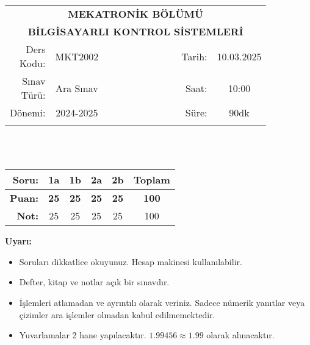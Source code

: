\newcommand\UniversiteAdi{Niğde Ömer Halisdemir Üniversitesi}
\newcommand\BolumAdi{MEKATRONİK BÖLÜMÜ}
\newcommand\DersKodu{MKT2002}
\newcommand\DersAdi{BİLGİSAYARLI KONTROL SİSTEMLERİ}
\newcommand\SinavAdi{Ara Sınav}
\newcommand\SinavTarihi{10.03.2025}
\newcommand\SinavSaati{10:00}
\newcommand\SinavSuresi{90dk}

\pagestyle{fancy}
\fancyhf{} %
\noindent
\begin{tabular}{
    p{0.15\linewidth}
    p{0.15\linewidth}
    p{0.3\linewidth}
    p{0.1\linewidth}
    p{0.15\linewidth}}
    \multicolumn{5}{c}{\textbf{\BolumAdi}}\\
    \multicolumn{5}{c}{\textbf{\DersAdi}}\\\hline
    \multicolumn{1}{|r|}{Ders Kodu:}&
    \multicolumn{1}{|c|}{\DersKodu}&
    \multicolumn{1}{|c|}{}& 
    \multicolumn{1}{|r|}{Tarih:}&
    \multicolumn{1}{|c|}{\SinavTarihi} \\\hline
    \multicolumn{1}{|r|}{Sınav Türü:}&
    \multicolumn{1}{|c|}{\SinavAdi}&  
    \multicolumn{1}{|c|}{}&
    \multicolumn{1}{|r|}{Saat:}&
    \multicolumn{1}{|c|}{\SinavSaati}\\\hline
    \multicolumn{1}{|r|}{Dönemi:}&
    \multicolumn{1}{|c|}{2024-2025}&
    \multicolumn{1}{|c|}{}&
    \multicolumn{1}{|r|}{Süre:}&
    \multicolumn{1}{|c|}{\SinavSuresi} \\\hline
    &&&&\\
\end{tabular}\\\\
\noindent\begin{center}
\begin{tabular}{|r|c|c|c|c|c|}\hline
    \textbf{Soru:}&
    \textbf{1a}&
    \textbf{1b}&
    \textbf{2a}&
    \textbf{2b}&
    \textbf{Toplam}\\\hline
    \textbf{Puan:}&
    \textbf{25}&
    \textbf{25}&
    \textbf{25}&
    \textbf{25}&
    \textbf{100}\\\hline
    \textbf{Not:}&25&25&25&25&100\\\hline
\end{tabular}\end{center}
\noindent\textbf{Uyarı:}
\begin{itemize}\bfseries
    \item Soruları dikkatlice okuyunuz. Hesap makinesi kullanılabilir.
    \item Defter, kitap ve notlar açık bir sınavdır.
    \item İşlemleri atlamadan ve ayrıntılı olarak veriniz. Sadece nümerik yanıtlar veya çizimler ara işlemler olmadan kabul edilmemektedir.
    \item Yuvarlamalar 2 hane yapılacaktır. $\mathbf{1.99456\approx1.99}$ olarak alınacaktır.
\end{itemize}

